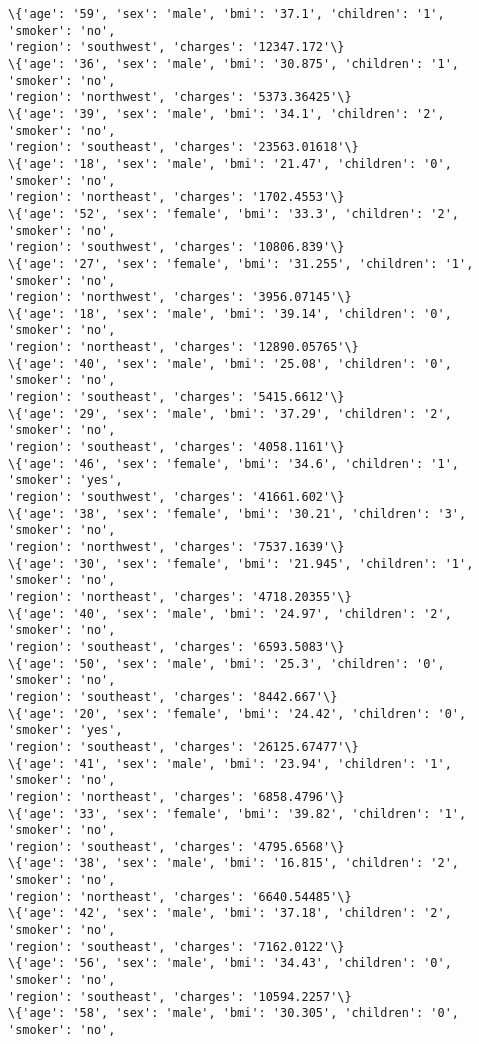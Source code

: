 \documentclass[11pt]{article}
\begin{document}
\begin{Verbatim}[commandchars=\\\{\}]
\{'age': '59', 'sex': 'male', 'bmi': '37.1', 'children': '1', 'smoker': 'no',
'region': 'southwest', 'charges': '12347.172'\}
\{'age': '36', 'sex': 'male', 'bmi': '30.875', 'children': '1', 'smoker': 'no',
'region': 'northwest', 'charges': '5373.36425'\}
\{'age': '39', 'sex': 'male', 'bmi': '34.1', 'children': '2', 'smoker': 'no',
'region': 'southeast', 'charges': '23563.01618'\}
\{'age': '18', 'sex': 'male', 'bmi': '21.47', 'children': '0', 'smoker': 'no',
'region': 'northeast', 'charges': '1702.4553'\}
\{'age': '52', 'sex': 'female', 'bmi': '33.3', 'children': '2', 'smoker': 'no',
'region': 'southwest', 'charges': '10806.839'\}
\{'age': '27', 'sex': 'female', 'bmi': '31.255', 'children': '1', 'smoker': 'no',
'region': 'northwest', 'charges': '3956.07145'\}
\{'age': '18', 'sex': 'male', 'bmi': '39.14', 'children': '0', 'smoker': 'no',
'region': 'northeast', 'charges': '12890.05765'\}
\{'age': '40', 'sex': 'male', 'bmi': '25.08', 'children': '0', 'smoker': 'no',
'region': 'southeast', 'charges': '5415.6612'\}
\{'age': '29', 'sex': 'male', 'bmi': '37.29', 'children': '2', 'smoker': 'no',
'region': 'southeast', 'charges': '4058.1161'\}
\{'age': '46', 'sex': 'female', 'bmi': '34.6', 'children': '1', 'smoker': 'yes',
'region': 'southwest', 'charges': '41661.602'\}
\{'age': '38', 'sex': 'female', 'bmi': '30.21', 'children': '3', 'smoker': 'no',
'region': 'northwest', 'charges': '7537.1639'\}
\{'age': '30', 'sex': 'female', 'bmi': '21.945', 'children': '1', 'smoker': 'no',
'region': 'northeast', 'charges': '4718.20355'\}
\{'age': '40', 'sex': 'male', 'bmi': '24.97', 'children': '2', 'smoker': 'no',
'region': 'southeast', 'charges': '6593.5083'\}
\{'age': '50', 'sex': 'male', 'bmi': '25.3', 'children': '0', 'smoker': 'no',
'region': 'southeast', 'charges': '8442.667'\}
\{'age': '20', 'sex': 'female', 'bmi': '24.42', 'children': '0', 'smoker': 'yes',
'region': 'southeast', 'charges': '26125.67477'\}
\{'age': '41', 'sex': 'male', 'bmi': '23.94', 'children': '1', 'smoker': 'no',
'region': 'northeast', 'charges': '6858.4796'\}
\{'age': '33', 'sex': 'female', 'bmi': '39.82', 'children': '1', 'smoker': 'no',
'region': 'southeast', 'charges': '4795.6568'\}
\{'age': '38', 'sex': 'male', 'bmi': '16.815', 'children': '2', 'smoker': 'no',
'region': 'northeast', 'charges': '6640.54485'\}
\{'age': '42', 'sex': 'male', 'bmi': '37.18', 'children': '2', 'smoker': 'no',
'region': 'southeast', 'charges': '7162.0122'\}
\{'age': '56', 'sex': 'male', 'bmi': '34.43', 'children': '0', 'smoker': 'no',
'region': 'southeast', 'charges': '10594.2257'\}
\{'age': '58', 'sex': 'male', 'bmi': '30.305', 'children': '0', 'smoker': 'no',

\end{Verbatim}
\end{document}
